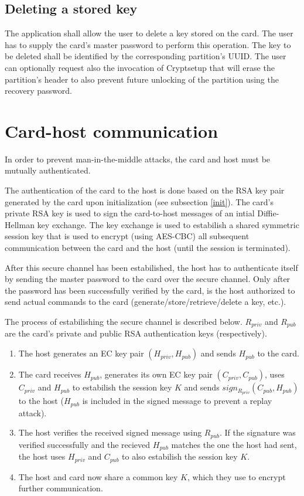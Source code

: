 \documentclass[10pt,a4paper]{article}
\begin{document}
\subsection{Deleting a stored key}
The application shall allow the user to delete a key stored on the card. The user has to supply the card's master password to perform this operation. The key to be deleted shall be identified by the corresponding partition's UUID. The user can optionally request also the invocation of Cryptsetup that will erase the partition's header to also prevent future unlocking of the partition using the recovery password.

\section{Card-host communication} \label{communication}
In order to prevent man-in-the-middle attacks, the card and host must be mutually authenticated.

The authentication of the card to the host is done based on the RSA key pair generated by the card upon initialization (see subsection \ref{init}). The card's private RSA key is used to sign the card-to-host messages of an intial Diffie-Hellman key exchange. The key exchange is used to estabilish a shared symmetric session key that is used to encrypt (using AES-CBC) all subsequent communication between the card and the host (until the session is terminated).

After this secure channel has been estabilished, the host has to authenticate itself by sending the master password to the card over the secure channel. Only after the password has been successfully verified by the card, is the host authorized to send actual commands to the card (generate/store/retrieve/delete a key, etc.).

The process of estabilishing the secure channel is described below. $R_{priv}$ and $R_{pub}$ are the card's private and public RSA authentication keys (respectively).
\begin{enumerate}
\item The host generates an EC key pair $(H_{priv}, H_{pub})$ and sends $H_{pub}$ to the card.
\item The card receives $H_{pub}$, generates its own EC key pair $(C_{priv}, C_{pub})$, uses $C_{priv}$ and $H_{pub}$ to estabilish the session key $K$ and sends $sign_{R_{priv}}(C_{pub}, H_{pub})$ to the host ($H_{pub}$ is included in the signed message to prevent a replay attack).
\item The host verifies the received signed message using $R_{pub}$. If the signature was verified successfully and the recieved $H_{pub}$ matches the one the host had sent, the host uses $H_{priv}$ and $C_{pub}$ to also estabilish the session key $K$.
\item The host and card now share a common key $K$, which they use to encrypt further communication.
\end{enumerate}
\end{document}

